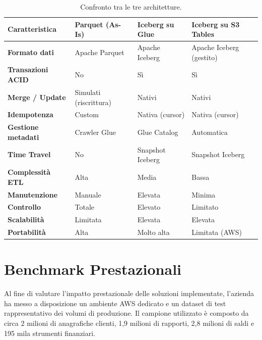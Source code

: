 \documentclass[12pt,a4paper,openright,twoside]{book}
\begin{document}
\begin{table}[H]
\centering
\small
\caption{Confronto tra le tre architetture.}
\label{tab:confronto-architetture}
\renewcommand{\arraystretch}{1.4}
\begin{tabular}{>{\raggedright}p{38mm}>{\centering}p{28mm}>{\centering}p{28mm}>{\centering\arraybackslash}p{32mm}}
\toprule
\textbf{Caratteristica} & \textbf{Parquet (As-Is)} & \textbf{Iceberg su Glue} & \textbf{Iceberg su S3 Tables} \\
\midrule
\textbf{Formato dati}        & Apache Parquet         & Apache Iceberg          & Apache Iceberg (gestito) \\
\textbf{Transazioni ACID}    & No                     & Sì                      & Sì \\
\textbf{Merge / Update}      & Simulati (riscrittura) & Nativi                  & Nativi \\
\textbf{Idempotenza}         & Custom                 & Nativa (cursor)         & Nativa (cursor) \\
\textbf{Gestione metadati}   & Crawler Glue           & Glue Catalog            & Automatica \\
\textbf{Time Travel}         & No                     & Snapshot Iceberg        & Snapshot Iceberg \\
\textbf{Complessità ETL}     & Alta                   & Media                   & Bassa \\
\textbf{Manutenzione}        & Manuale                & Elevata                 & Minima \\
\textbf{Controllo}           & Totale                 & Elevato                 & Limitato \\
\textbf{Scalabilità}         & Limitata               & Elevata                 & Elevata \\
\textbf{Portabilità}         & Alta                   & Molto alta              & Limitata (AWS) \\
\bottomrule
\end{tabular}
\end{table}

\newpage
\section{Benchmark Prestazionali}
\label{sec:benchmark}

Al fine di valutare l'impatto prestazionale delle soluzioni implementate, l'azienda ha messo a disposizione un ambiente AWS dedicato e un dataset di test rappresentativo dei volumi di produzione. Il campione utilizzato è composto da circa 2 milioni di anagrafiche clienti, 1,9 milioni di rapporti, 2,8 milioni di saldi e 195 mila strumenti finanziari.
\end{document}
